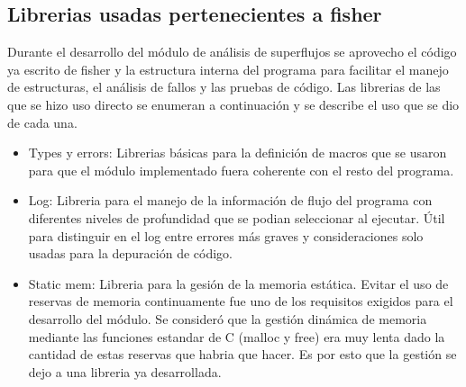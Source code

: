 \documentclass[twoside, 12pt]{epstfg}
\begin{document}
\subsection{Librerias usadas pertenecientes a fisher}
Durante el desarrollo del módulo de análisis de superflujos se aprovecho el código ya escrito de fisher y la estructura interna del programa para facilitar el manejo de estructuras, el análisis de fallos y las pruebas de código. Las librerias de las que se hizo uso directo se enumeran a continuación y se describe el uso que se dio de cada una.
\begin{itemize}[itemsep=0pt, topsep = 5pt]
  \item Types y errors: Librerias básicas para la definición de macros que se usaron para que el módulo implementado fuera coherente con el resto del programa.
  \item Log: Libreria para el manejo de la información de flujo del programa con diferentes niveles de profundidad que se podian seleccionar al ejecutar. Útil para distinguir en el log entre errores más graves y consideraciones solo usadas para la depuración de código.
  \item Static mem: Libreria para la gesión de la memoria estática. Evitar el uso de reservas de memoria continuamente fue uno de los requisitos exigidos para el desarrollo del módulo. Se consideró que la gestión dinámica de memoria mediante las funciones estandar de C (malloc y free) era muy lenta dado la cantidad de estas reservas que habria que hacer. Es por esto que la gestión se dejo a una libreria ya desarrollada. 


\end{itemize}
\end{document}
